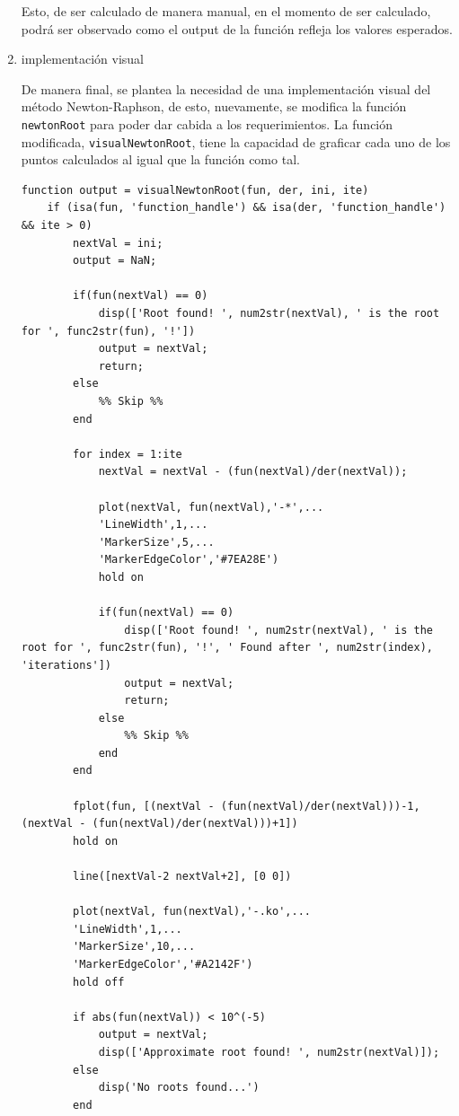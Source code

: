 \documentclass[english,notitlepage,letterpaper, 10pt]{article} %
\begin{document}
\begin{enumerate}
    Esto, de ser calculado de manera manual, en el momento de ser calculado, podrá ser observado como el output de la función refleja los valores esperados.

    \item implementación visual

    De manera final, se plantea la necesidad de una implementación visual del método Newton-Raphson, de esto, nuevamente, se modifica la función \texttt{newtonRoot} para poder dar cabida a los requerimientos. La función modificada, \texttt{visualNewtonRoot}, tiene la capacidad de graficar cada uno de los puntos calculados al igual que la función como tal.

    \begin{lstlisting}
function output = visualNewtonRoot(fun, der, ini, ite)
    if (isa(fun, 'function_handle') && isa(der, 'function_handle') && ite > 0)
        nextVal = ini;
        output = NaN;

        if(fun(nextVal) == 0) 
            disp(['Root found! ', num2str(nextVal), ' is the root for ', func2str(fun), '!'])
            output = nextVal;    
            return;
        else
            %% Skip %%
        end
        
        for index = 1:ite
            nextVal = nextVal - (fun(nextVal)/der(nextVal));

            plot(nextVal, fun(nextVal),'-*',...
            'LineWidth',1,...
            'MarkerSize',5,...
            'MarkerEdgeColor','#7EA28E')
            hold on

            if(fun(nextVal) == 0) 
                disp(['Root found! ', num2str(nextVal), ' is the root for ', func2str(fun), '!', ' Found after ', num2str(index), 'iterations'])
                output = nextVal;
                return;
            else
                %% Skip %%
            end
        end

        fplot(fun, [(nextVal - (fun(nextVal)/der(nextVal)))-1, (nextVal - (fun(nextVal)/der(nextVal)))+1])
        hold on

        line([nextVal-2 nextVal+2], [0 0])

        plot(nextVal, fun(nextVal),'-.ko',...
        'LineWidth',1,...
        'MarkerSize',10,...
        'MarkerEdgeColor','#A2142F')
        hold off

        if abs(fun(nextVal)) < 10^(-5)
            output = nextVal;
            disp(['Approximate root found! ', num2str(nextVal)]);
        else
            disp('No roots found...')
        end


\end{lstlisting}
\end{enumerate}
\end{document}
